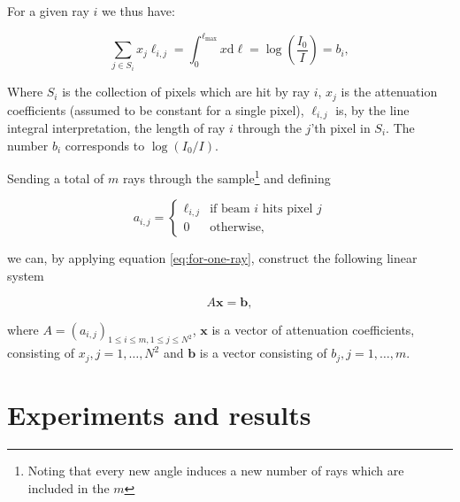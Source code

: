 \documentclass{article}
\begin{document}

For a given ray $i$ we thus have:

\begin{equation}\label{eq:for-one-ray}
    \sum_{j \in S_i} x_j \ell_{i, j} = \int_{0}^{\ell_{\max}}x \text{d} \ell = \log\left(\frac{I_0}{I}\right) = b_i,
\end{equation}

Where $S_i$ is the collection of pixels which are hit by ray $i$, $x_j$ is the attenuation coefficients (assumed to be constant for a single pixel), $\ell_{i, j}$ is, by the line integral interpretation, the length of ray $i$ through the $j$'th pixel in $S_i$. The number $b_i$ corresponds to $\log{(I_0 / I)}$. 

Sending a total of $m$ rays through the sample\footnote{Noting that every new angle induces a new number of rays which are included in the $m$}  and defining

\begin{equation}
    a_{i, j} = 
    \begin{cases}
        \ell_{i, j} & \text{if beam $i$ hits pixel $j$} \\
        0 & \text{otherwise,}
    \end{cases}
\end{equation}

we can, by applying equation \ref{eq:for-one-ray}, construct the following linear system

\begin{equation}
    A \boldsymbol{x} = \boldsymbol{b},
\end{equation}

where $A = (a_{i,j})_{1 \leq i \leq m, 1 \leq j \leq N^2}$, $\boldsymbol{x}$ is a vector of attenuation coefficients, consisting of $x_j, j = 1, \dots, N^2$ and $\boldsymbol{b}$ is a vector consisting of $b_j, j = 1, \dots, m$. 

\section{Experiments and results}
\end{document}
